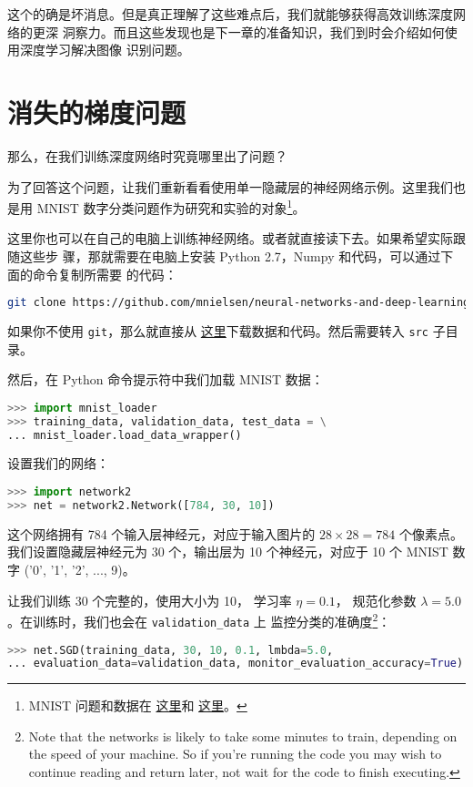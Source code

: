 这个的确是坏消息。但是真正理解了这些难点后，我们就能够获得高效训练深度网络的更深
洞察力。而且这些发现也是下一章的准备知识，我们到时会介绍如何使用深度学习解决图像
识别问题。

\section{消失的梯度问题}
\label{sec:the_vanishing_gradient_problem}

那么，在我们训练深度网络时究竟哪里出了问题？
 
为了回答这个问题，让我们重新看看使用单一隐藏层的神经网络示例。这里我们也是用
MNIST 数字分类问题作为研究和实验的对象\footnote{ MNIST 问题和数据在%
  \hyperref[sec:learning_with_gradient_descent]{这里}和%
  \hyperref[sec:implementing_our_network_to_classify_digits]{这里}。}。
 
这里你也可以在自己的电脑上训练神经网络。或者就直接读下去。如果希望实际跟随这些步
骤，那就需要在电脑上安装 Python 2.7，Numpy 和代码，可以通过下面的命令复制所需要
的代码：
\begin{lstlisting}[language=sh]
git clone https://github.com/mnielsen/neural-networks-and-deep-learning.git  
\end{lstlisting}

如果你不使用 \lstinline!git!，那么就直接从%
\href{https://github.com/mnielsen/neural-networks-and-deep-learning/archive/master.zip}{
  这里}下载数据和代码。然后需要转入 \lstinline!src! 子目录。

然后，在 Python 命令提示符中我们加载 MNIST 数据：
\begin{lstlisting}[language=Python]
>>> import mnist_loader
>>> training_data, validation_data, test_data = \
... mnist_loader.load_data_wrapper()  
\end{lstlisting}

设置我们的网络：
\begin{lstlisting}[language=Python]
>>> import network2 
>>> net = network2.Network([784, 30, 10]) 
\end{lstlisting}

这个网络拥有 784 个输入层神经元，对应于输入图片的 $28 \times 28 = 784$ 个像素点。
我们设置隐藏层神经元为 30 个，输出层为 10 个神经元，对应于 10 个 MNIST 数字
('0', '1', '2', ..., 9)。

让我们训练 30 个完整的\epochs{}，使用\minibatch{}大小为 10， 学习率 $\eta = 0.1$，
规范化参数 $\lambda = 5.0$。在训练时，我们也会在 \lstinline!validation_data! 上
监控分类的准确度\footnote{Note that the networks is likely to take some minutes
  to train, depending on the speed of your machine. So if you're running the
  code you may wish to continue reading and return later, not wait for the code
  to finish executing.}：
\begin{lstlisting}[language=Python]
>>> net.SGD(training_data, 30, 10, 0.1, lmbda=5.0,  
... evaluation_data=validation_data, monitor_evaluation_accuracy=True) 
\end{lstlisting}

